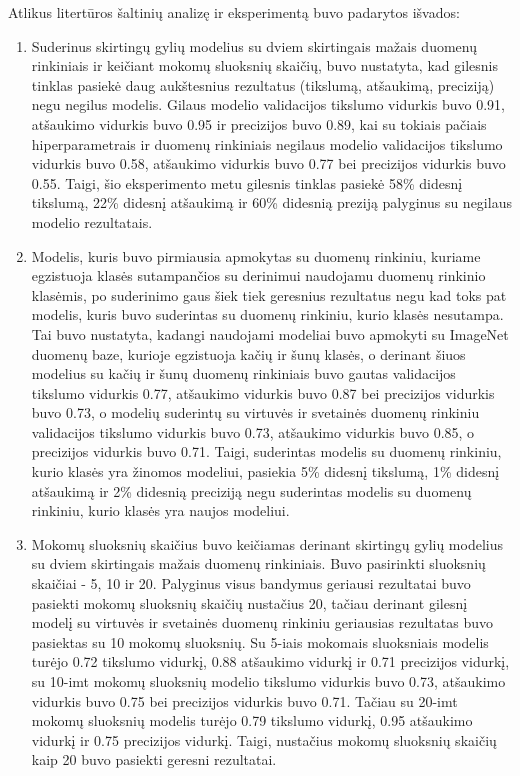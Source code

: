 \documentclass{VUMIFPSbakalaurinis}
\begin{document}
Atlikus litertūros šaltinių analizę ir eksperimentą buvo padarytos išvados:
\begin{enumerate}
  \item Suderinus skirtingų gylių modelius su dviem skirtingais mažais duomenų rinkiniais ir keičiant mokomų sluoksnių skaičių, buvo nustatyta, kad gilesnis tinklas pasiekė daug aukštesnius rezultatus (tikslumą, atšaukimą, preciziją) negu negilus modelis. Gilaus modelio validacijos tikslumo vidurkis buvo 0.91, atšaukimo vidurkis buvo 0.95 ir precizijos buvo 0.89, kai su tokiais pačiais hiperparametrais ir duomenų rinkiniais negilaus modelio validacijos tikslumo vidurkis buvo 0.58, atšaukimo vidurkis buvo 0.77 bei precizijos vidurkis buvo 0.55. Taigi, šio eksperimento metu gilesnis tinklas pasiekė 58\% didesnį tikslumą, 22\% didesnį atšaukimą ir 60\% didesnią preziją palyginus su negilaus modelio rezultatais.
  \item Modelis, kuris buvo pirmiausia apmokytas su duomenų rinkiniu, kuriame egzistuoja klasės sutampančios su derinimui naudojamu duomenų rinkinio klasėmis, po suderinimo gaus šiek tiek geresnius rezultatus negu kad toks pat modelis, kuris buvo suderintas su duomenų rinkiniu, kurio klasės nesutampa. Tai buvo nustatyta, kadangi naudojami modeliai buvo apmokyti su ImageNet duomenų baze, kurioje egzistuoja kačių ir šunų klasės, o derinant šiuos modelius su kačių ir šunų duomenų rinkiniais buvo gautas validacijos tikslumo vidurkis 0.77, atšaukimo vidurkis buvo 0.87 bei precizijos vidurkis buvo 0.73, o modelių suderintų su virtuvės ir svetainės duomenų rinkiniu validacijos tikslumo vidurkis buvo 0.73, atšaukimo vidurkis buvo 0.85, o precizijos vidurkis buvo 0.71. Taigi, suderintas modelis su duomenų rinkiniu, kurio klasės yra žinomos modeliui, pasiekia 5\% didesnį tikslumą, 1\% didesnį atšaukimą ir 2\% didesnią preciziją negu suderintas modelis su duomenų rinkiniu, kurio klasės yra naujos modeliui.
  \item Mokomų sluoksnių skaičius buvo keičiamas derinant skirtingų gylių modelius su dviem skirtingais mažais duomenų rinkiniais. Buvo pasirinkti sluoksnių skaičiai - 5, 10 ir 20. Palyginus visus bandymus geriausi rezultatai buvo pasiekti mokomų sluoksnių skaičių nustačius 20, tačiau derinant gilesnį modelį su virtuvės ir svetainės duomenų rinkiniu geriausias rezultatas buvo pasiektas su 10 mokomų sluoksnių. Su 5-iais mokomais sluoksniais modelis turėjo 0.72 tikslumo vidurkį, 0.88 atšaukimo vidurkį ir 0.71 precizijos vidurkį, su 10-imt mokomų sluoksnių modelio tikslumo vidurkis buvo 0.73, atšaukimo vidurkis buvo 0.75 bei precizijos vidurkis buvo 0.71. Tačiau su 20-imt mokomų sluoksnių modelis turėjo 0.79 tikslumo vidurkį, 0.95 atšaukimo vidurkį ir 0.75 precizijos vidurkį. Taigi, nustačius mokomų sluoksnių skaičių kaip 20 buvo pasiekti geresni rezultatai.
\end{enumerate}
\end{document}
